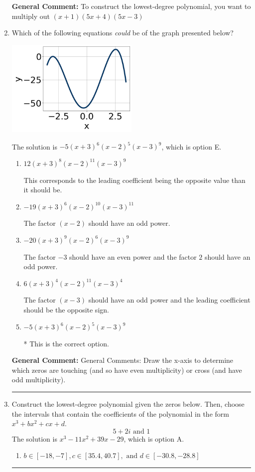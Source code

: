 \documentclass{extbook}[14pt]
\newcommand{\litem}[1]{\item #1

\rule{\textwidth}{0.4pt}}
\begin{document}
\begin{enumerate}
{\textbf{General Comment:} To construct the lowest-degree polynomial, you want to multiply out $(x + 1)(5x + 4)(5x -3)$
}
\litem{
Which of the following equations \textit{could} be of the graph presented below?

\begin{center}
    \includegraphics[width=0.5\textwidth]{../Figures/polyGraphToFunctionCopyB.png}
\end{center}


The solution is \( -5(x + 3)^{6} (x - 2)^{5} (x - 3)^{9} \), which is option E.\begin{enumerate}[label=\Alph*.]
\item \( 12(x + 3)^{8} (x - 2)^{11} (x - 3)^{9} \)

This corresponds to the leading coefficient being the opposite value than it should be.
\item \( -19(x + 3)^{6} (x - 2)^{10} (x - 3)^{11} \)

The factor $(x - 2)$ should have an odd power.
\item \( -20(x + 3)^{9} (x - 2)^{6} (x - 3)^{9} \)

The factor $-3$ should have an even power and the factor $2$ should have an odd power.
\item \( 6(x + 3)^{4} (x - 2)^{11} (x - 3)^{4} \)

The factor $(x - 3)$ should have an odd power and the leading coefficient should be the opposite sign.
\item \( -5(x + 3)^{6} (x - 2)^{5} (x - 3)^{9} \)

* This is the correct option.
\end{enumerate}

\textbf{General Comment:} General Comments: Draw the x-axis to determine which zeros are touching (and so have even multiplicity) or cross (and have odd multiplicity).
}
\litem{
Construct the lowest-degree polynomial given the zeros below. Then, choose the intervals that contain the coefficients of the polynomial in the form $x^3+bx^2+cx+d$.
\[ 5 + 2 i \text{ and } 1 \]The solution is \( x^{3} -11 x^{2} +39 x -29 \), which is option A.\begin{enumerate}[label=\Alph*.]
\item \( b \in [-18, -7], c \in [35.4, 40.7], \text{ and } d \in [-30.8, -28.8] \)


\end{enumerate}}
\end{enumerate}
\end{document}
